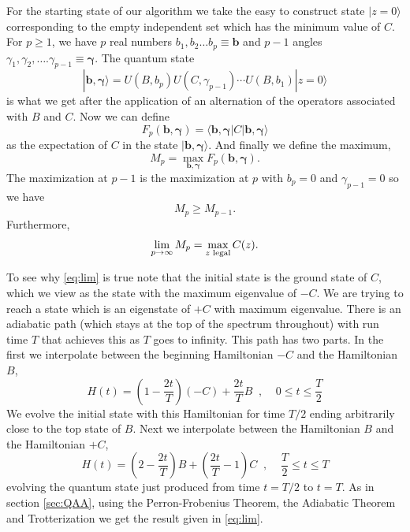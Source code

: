 \documentclass[t11pt,reprint,preprint,preprintnumbers]{revtex4}
\begin{document}
For the starting state of our algorithm we take the easy to construct state $|z\!=\!0\rangle$  corresponding to the empty independent set which has the minimum value of $C$.  For $p \geq 1$, we have $p$ real numbers $b_1, b_2 \ldots  b_p \equiv \mathbf{b}$ and $p-1$ angles $\gamma_1, \gamma_2, ….\gamma_{p-1} \equiv \boldsymbol{\gamma}$.  The quantum state 
\begin{equation}
|\mathbf{b},\boldsymbol{\gamma}\rangle = U(B,b_p)U(C,\gamma_{p-1})\cdots U(B,b_1)|z\!=\!0\rangle \label{eq:lotsu}
\end{equation}
\noindent is what we get after the application of an alternation of the operators associated with $B$ and $C$.  Now we can define
\begin{equation}
F_p(\mathbf{b},\boldsymbol{\gamma}) = \langle \mathbf{b},\boldsymbol{\gamma}|C|\mathbf{b},\boldsymbol{\gamma}\rangle \label{eq:fexpect}
\end{equation}
\noindent as the expectation of $C$ in the state  $|\mathbf{b}, \boldsymbol{\gamma}\rangle$.    And finally we define the maximum,
\begin{equation}
M_p = \max_{\mathbf{b},\boldsymbol{\gamma}} F_p(\mathbf{b},\boldsymbol{\gamma}). \label{eq:fmax}
\end{equation}
The maximization at $p-1$ is the maximization at $p$ with $b_p=0$ and $\gamma_{p-1} = 0$ so we have
\begin{equation}
M_p \geq M_{p-1}.
\end{equation}
\noindent Furthermore,
\begin{equation}
\lim_{p \rightarrow \infty} M_p = \max_{z{\small \textnormal{ legal}}} C(z). \label{eq:lim}
\end{equation}

To see why \eqref{eq:lim} is true note that the initial state is the ground state of $C$, which we view as the state with the maximum eigenvalue of $-C$.   We are trying to reach a state which is an eigenstate of $+C$ with maximum eigenvalue.  There is an adiabatic path (which stays at the top of the spectrum throughout) with run time $T$ that achieves this as $T$ goes to infinity.   This path has two parts.  In the first we interpolate between the beginning Hamiltonian $-C$ and the Hamiltonian $B$,
\begin{equation}
H(t) = \left(1- \frac{2t}{T}\right)(-C) + \frac{2t}{T}B \; \; ,  \; \; \; \; 0 \leq t \leq \frac{T}{2}
\end{equation}
\noindent We evolve the initial state with this Hamiltonian for time $T/2$ ending arbitrarily close to the top state of $B$.   Next we interpolate between the Hamiltonian $B$ and the Hamiltonian $+C$,
\begin{equation}
H(t) = \left(2 - \frac{2t}{T}\right)B + \left(\frac{2t}{T}-1\right)C\; \; ,  \; \; \; \;  \frac{T}{2} \leq t \leq T
\end{equation}
\noindent evolving the quantum state just produced from time $t=T/2$ to $t=T$.  As in section \ref{sec:QAA}, using the Perron-Frobenius Theorem, the Adiabatic Theorem and Trotterization we get the result given in \eqref{eq:lim}.
\end{document}
